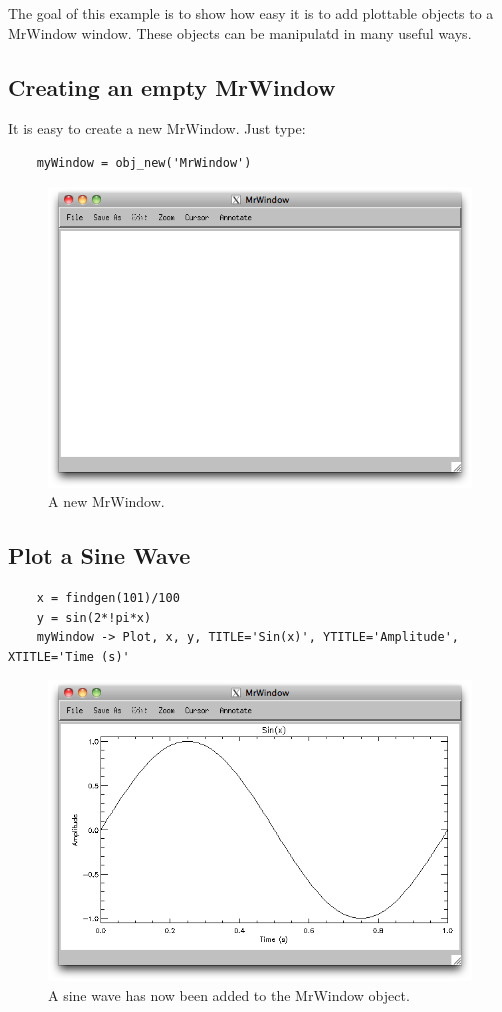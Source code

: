 \documentclass[12pt, letterpaper, oneside]{article}		%
\begin{document}
The goal of this example is to show how easy it is to add plottable objects to a MrWindow window. These objects can be manipulatd in many useful ways.

\subsection{Creating an empty MrWindow}

It is easy to create a new MrWindow. Just type:

\begin{lstlisting}
    myWindow = obj_new('MrWindow')
\end{lstlisting}

\begin{figure}[h!]
  \centering
  \includegraphics[width=0.4 \textwidth]{./figures/MrWindow_new.png}
  \caption[A new MrWindow.]
   {A new MrWindow.}
\end{figure}


\subsection{Plot a Sine Wave}

\begin{lstlisting}
    x = findgen(101)/100
    y = sin(2*!pi*x)
    myWindow -> Plot, x, y, TITLE='Sin(x)', YTITLE='Amplitude', XTITLE='Time (s)'
\end{lstlisting}

\begin{figure}[h!]
  \centering
  \includegraphics[width=0.5 \textwidth]{./figures/Sine-wave.png}
  \caption[Sin(x) in MrWindow.]
   {A sine wave has now been added to the MrWindow object.}
\end{figure}
\end{document}
